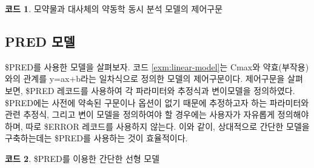 \documentclass[
  10pt,
  krantz2,
  a4paper]{krantz}
\newenvironment{Shaded}{\begin{snugshade}}{\end{snugshade}}
\newcommand{\DecValTok}[1]{\textcolor[rgb]{0.00,0.00,0.81}{#1}}
\newcommand{\FloatTok}[1]{\textcolor[rgb]{0.00,0.00,0.81}{#1}}
\newcommand{\KeywordTok}[1]{\textcolor[rgb]{0.13,0.29,0.53}{\textbf{#1}}}
\newcommand{\NormalTok}[1]{#1}
\newcommand{\OperatorTok}[1]{\textcolor[rgb]{0.81,0.36,0.00}{\textbf{#1}}}
\newcommand{\StringTok}[1]{\textcolor[rgb]{0.31,0.60,0.02}{#1}}
\newenvironment{Shaded}{\begin{snugshade}}{\end{snugshade}}
\theoremstyle{definition}
\theoremstyle{definition}
\newtheorem{example}{코드}[chapter]
\theoremstyle{definition}
\theoremstyle{remark}
\begin{document}
\begin{example}
\protect\hypertarget{exm:parent-metabolite}{}{\label{exm:parent-metabolite} }모약물과 대사체의 약동학 동시 분석 모델의 제어구문
\end{example}

\hypertarget{pred-uxbaa8uxb378}{%
\subsection{PRED 모델}\label{pred-uxbaa8uxb378}}

\$PRED를 사용한 모델을 살펴보자. 코드 \ref{exm:linear-model}는 Cmax와 약효(부작용)와의 관계를 y=ax+b라는 일차식으로 정의한 모델의 제어구문이다. 제어구문을 살펴보면, \$PRED 레코드를 사용하여 각 파라미터와 추정식과 변이모델을 정의하였다. \$PRED에는 사전에 약속된 구문이나 옵션이 없기 때문에 추정하고자 하는 파라미터와 관련 추정식, 그리고 변이 모델을 정의하여야 할 경우에는 사용자가 자유롭게 정의해야 하며, 따로 \$ERROR 레코드를 사용하지 않는다. 이와 같이, 상대적으로 간단한 모델을 구축하는데는 \$PRED를 사용하는 것이 효율적이다.

\begin{Shaded}
\end{Shaded}

\begin{example}
\protect\hypertarget{exm:linear-model}{}{\label{exm:linear-model} }\$PRED를 이용한 간단한 선형 모델
\end{example}
\end{document}
